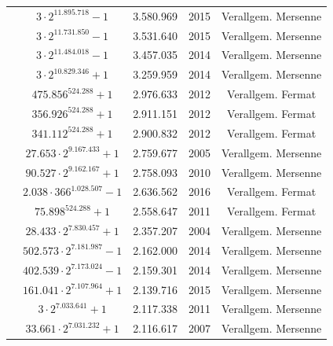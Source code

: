 \begin{refsegment}
\begin{table}[ht]
\begin{center}
\begin{tabular}{|c|cccc|}
	\rowno & $3 \cdot 2^{11.895.718}-1$ & 3.580.969 & 2015 & Verallgem. Mersenne \\
	\rowno & $3 \cdot 2^{11.731.850}-1$ & 3.531.640 & 2015 & Verallgem. Mersenne \\
	\rowno & $3 \cdot 2^{11.484.018}-1$ & 3.457.035 & 2014 & Verallgem. Mersenne \\
	\rowno & $3 \cdot 2^{10.829.346}+1$ & 3.259.959 & 2014 & Verallgem. Mersenne \\
	\rowno & $ 475.856^{524.288}+1$ &   2.976.633 & 2012 & Verallgem. Fermat \\
	\rowno & $ 356.926^{524.288}+1$ &   2.911.151 & 2012 & Verallgem. Fermat \\
	\rowno & $ 341.112^{524.288}+1$ &   2.900.832 & 2012 & Verallgem. Fermat \\

	\rowno & $27.653 \cdot 2^{9.167.433}+1$ & 2.759.677 & 2005 & Verallgem. Mersenne \\%

	\rowno & $90.527 \cdot 2^{9.162.167}+1$ & 2.758.093 & 2010 & Verallgem. Mersenne \\
	\rowno & $2.038 \cdot 366^{1.028.507}-1$ & 2.636.562 & 2016 & Verallgem. Fermat \\
	\rowno & $75.898^{524.288}+1$ & 2.558.647 & 2011 & Verallgem. Fermat \\

	\rowno & $28.433 \cdot 2^{7.830.457}+1$ & 2.357.207 & 2004 & Verallgem. Mersenne \\%

	\rowno & $502.573 \cdot 2^{7.181.987}-1$ & 2.162.000 & 2014 & Verallgem. Mersenne \\
	\rowno & $402.539 \cdot 2^{7.173.024}-1$ & 2.159.301 & 2014 & Verallgem. Mersenne \\
	\rowno & $161.041 \cdot 2^{7.107.964}+1$ & 2.139.716 & 2015 & Verallgem. Mersenne \\
	\rowno & $3 \cdot 2^{7.033.641}+1$ & 2.117.338 & 2011 & Verallgem. Mersenne \\
	\rowno & $33.661 \cdot 2^{7.031.232}+1$ & 2.116.617 & 2007 & Verallgem. Mersenne \\


\end{tabular}
\end{center}
\end{table}
\end{refsegment}
